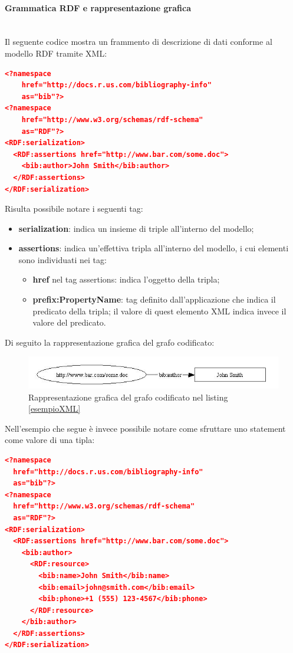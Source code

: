 \documentclass[12pt,a4paper,twoside]{book}
\begin{document}
\paragraph{Grammatica RDF e rappresentazione grafica}\mbox{}\\
Il seguente codice mostra un frammento di descrizione di dati conforme al modello RDF tramite XML:
\begin{lstlisting}[language=json,firstnumber=1,caption={Esempio di metadato conforme ad RDF in XML},captionpos=b,label=esempioXML]
<?namespace 
	href="http://docs.r.us.com/bibliography-info"
	as="bib"?> 
<?namespace 
	href="http://www.w3.org/schemas/rdf-schema"
	as="RDF"?> 
<RDF:serialization> 
  <RDF:assertions href="http://www.bar.com/some.doc"> 
    <bib:author>John Smith</bib:author> 
  </RDF:assertions> 
</RDF:serialization>
\end{lstlisting}
Risulta possibile notare i seguenti tag:
\begin{itemize}
\item \textbf{serialization}: indica un insieme di triple all'interno del modello;
\item \textbf{assertions}: indica un'effettiva tripla all'interno del modello, i cui elementi sono individuati nei tag:
\begin{itemize}
\item \textbf{href} nel tag assertions: indica l'oggetto della tripla;
\item \textbf{prefix:PropertyName}: tag definito dall'applicazione che indica il predicato della tripla; il valore di quest elemento XML indica invece il valore del predicato.
\end{itemize}
\end{itemize}
Di seguito la rappresentazione grafica del grafo codificato:
\begin{figure}[H]
\centering
\includegraphics[scale=.50]{../immagini/RDFXML.jpg}
\caption{Rappresentazione grafica del grafo codificato nel listing \ref{esempioXML}}
\label{imgEsempioXML}
\end{figure}
Nell'esempio che segue è invece possibile notare come sfruttare uno statement come valore di una tipla:
\begin{lstlisting}[language=json,firstnumber=1,caption={Esempio di metadato conforme ad RDF in XML},captionpos=b,label=esempioComplexXML]
<?namespace 
  href="http://docs.r.us.com/bibliography-info"
  as="bib"?> 
<?namespace 
  href="http://www.w3.org/schemas/rdf-schema"
  as="RDF"?> 
<RDF:serialization> 
  <RDF:assertions href="http://www.bar.com/some.doc"> 
    <bib:author> 
      <RDF:resource> 
        <bib:name>John Smith</bib:name> 
        <bib:email>john@smith.com</bib:email> 
        <bib:phone>+1 (555) 123-4567</bib:phone> 
      </RDF:resource> 
    </bib:author> 
  </RDF:assertions> 
</RDF:serialization>
\end{lstlisting}
\end{document}
